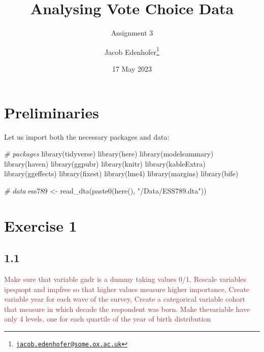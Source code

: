 \documentclass[
]{article}
\title{Analysing Vote Choice Data}
\subtitle{Assignment 3}
\author{Jacob Edenhofer\footnote{\href{mailto:jacob.edenhofer@some.ox.ac.uk}{\nolinkurl{jacob.edenhofer@some.ox.ac.uk}}}}
\date{17 May 2023}
\newenvironment{Shaded}{\begin{snugshade}}{\end{snugshade}}
\newcommand{\CommentTok}[1]{\textcolor[rgb]{0.56,0.35,0.01}{\textit{#1}}}
\newcommand{\FunctionTok}[1]{\textcolor[rgb]{0.00,0.00,0.00}{#1}}
\newcommand{\NormalTok}[1]{#1}
\newcommand{\OtherTok}[1]{\textcolor[rgb]{0.56,0.35,0.01}{#1}}
\newcommand{\StringTok}[1]{\textcolor[rgb]{0.31,0.60,0.02}{#1}}
\begin{document}
\maketitle

\hypertarget{preliminaries}{%
\section{Preliminaries}\label{preliminaries}}

Let us import both the necessary packages and data:

\begin{Shaded}
\begin{Highlighting}[]
\CommentTok{\# packages }
\FunctionTok{library}\NormalTok{(tidyverse)}
\FunctionTok{library}\NormalTok{(here)}
\FunctionTok{library}\NormalTok{(modelsummary)}
\FunctionTok{library}\NormalTok{(haven)}
\FunctionTok{library}\NormalTok{(ggpubr)}
\FunctionTok{library}\NormalTok{(knitr)}
\FunctionTok{library}\NormalTok{(kableExtra)}
\FunctionTok{library}\NormalTok{(ggeffects)}
\FunctionTok{library}\NormalTok{(fixest)}
\FunctionTok{library}\NormalTok{(lme4)}
\FunctionTok{library}\NormalTok{(margins)}
\FunctionTok{library}\NormalTok{(bife)}

\CommentTok{\# data}
\NormalTok{ess789 }\OtherTok{\textless{}{-}} \FunctionTok{read\_dta}\NormalTok{(}\FunctionTok{paste0}\NormalTok{(}\FunctionTok{here}\NormalTok{(), }\StringTok{"/Data/ESS789.dta"}\NormalTok{))}
\end{Highlighting}
\end{Shaded}

\hypertarget{exercise-1}{%
\section{Exercise 1}\label{exercise-1}}

\hypertarget{section}{%
\subsection{1.1}\label{section}}

\textcolor{brown}{Make sure that variable gndr is a dummy taking values 0/1, Rescale variables ipequopt and impfree so that higher values measure higher importance, Create variable year for each wave of the survey, Create a categorical variable cohort that measure in which decade the respondent was born. Make thevariable have only 4 levels, one for each quartile of the year of birth distribution}
\end{document}
